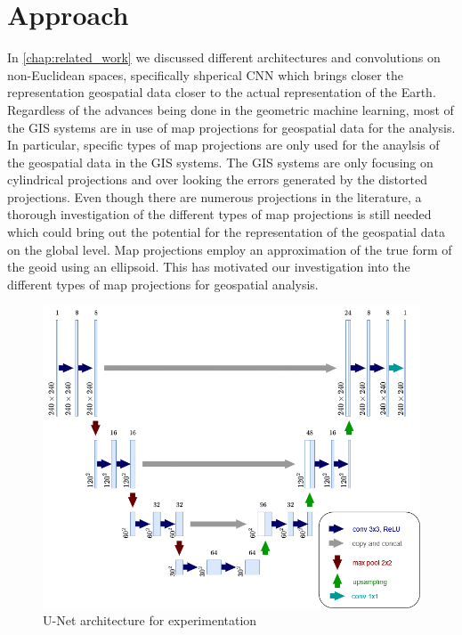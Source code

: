 \clearpage
\cleardoublepage

\chapter{Approach}
\label{chap:approach}
In  \autoref{chap:related_work} we discussed different architectures and convolutions on non-Euclidean spaces, specifically shperical CNN which brings closer the representation geospatial data closer to the actual representation of the Earth. Regardless of the advances being done in the geometric machine learning, most of the GIS systems are in use of map projections for geospatial data for the analysis. In particular, specific types of map projections are only used for the anaylsis of the geospatial data in the GIS systems. The GIS systems are only focusing on cylindrical projections and over looking the errors generated by the distorted projections. Even though there are numerous projections in the literature, a thorough investigation of the different types of map projections is still needed which could bring out the potential for the representation of the geospatial data on the global level. Map projections employ an approximation of the true form of the geoid using an ellipsoid. This has motivated our investigation into the different types of map projections for geospatial analysis.

\begin{figure}[h]
    \centering
    \includegraphics[width=1.0\linewidth]{figures/chapter-5/my_unet.png}
    \caption{U-Net architecture for experimentation }
    \label{fig:self-unet}
\end{figure}

